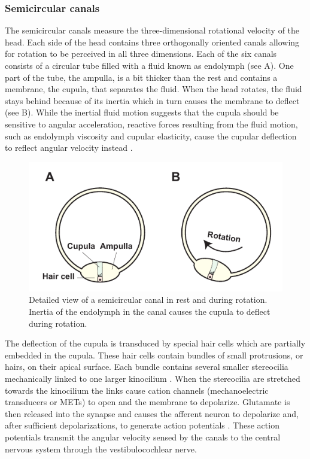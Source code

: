 \subsubsection{Semicircular canals}

The semicircular canals measure the three-dimensional rotational velocity of the head. Each side of the head contains three orthogonally oriented canals allowing for rotation to be perceived in all three dimensions. Each of the six canals consists of a circular tube filled with a fluid known as endolymph (see A). One part of the tube, the ampulla, is a bit thicker than the rest and contains a membrane, the cupula, that separates the fluid. When the head rotates, the fluid stays behind because of its inertia which in turn causes the membrane to deflect (see B). While the inertial fluid motion suggests that the cupula should be sensitive to angular acceleration, reactive forces resulting from the fluid motion, such as endolymph viscosity and cupular elasticity,  cause the cupular deflection to reflect angular velocity instead \cite{goldberg2012}.

\begin{figure}
    \includegraphics[width=1.0\textwidth]{src/intro/figures/canals.pdf}
    \caption{Detailed view of a semicircular canal  in rest and  during rotation. Inertia of the endolymph in the canal causes the cupula to deflect during rotation.}
    \label{intro:fig:canals}
\end{figure}

The deflection of the cupula is transduced by special hair cells which are partially embedded in the cupula. These hair cells contain bundles of small protrusions, or hairs, on their apical surface. Each bundle contains several smaller stereocilia mechanically linked to one larger kinocilium \cite{pickles1984}. When the stereocilia are stretched towards the kinocilium the links cause cation channels (mechanoelectric transducers or METs) to open and the membrane to depolarize. Glutamate is then released into the synapse and causes the afferent neuron to depolarize and, after sufficient depolarizations, to generate action potentials \cite{purves2012}. These action potentials transmit the angular velocity sensed by the canals to the central nervous system through the  vestibulocochlear nerve.

